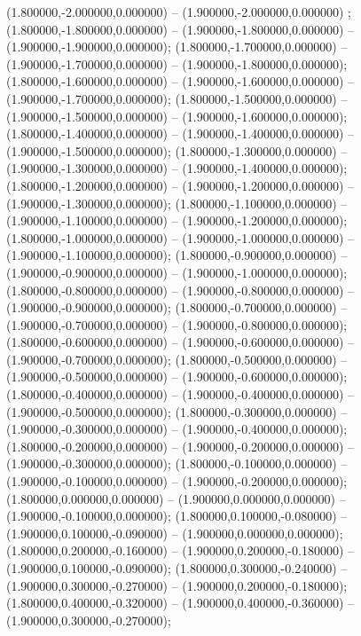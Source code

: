  (1.800000,-2.000000,0.000000) -- (1.900000,-2.000000,0.000000) ;
 (1.800000,-1.800000,0.000000) -- (1.900000,-1.800000,0.000000) -- (1.900000,-1.900000,0.000000);
 (1.800000,-1.700000,0.000000) -- (1.900000,-1.700000,0.000000) -- (1.900000,-1.800000,0.000000);
 (1.800000,-1.600000,0.000000) -- (1.900000,-1.600000,0.000000) -- (1.900000,-1.700000,0.000000);
 (1.800000,-1.500000,0.000000) -- (1.900000,-1.500000,0.000000) -- (1.900000,-1.600000,0.000000);
 (1.800000,-1.400000,0.000000) -- (1.900000,-1.400000,0.000000) -- (1.900000,-1.500000,0.000000);
 (1.800000,-1.300000,0.000000) -- (1.900000,-1.300000,0.000000) -- (1.900000,-1.400000,0.000000);
 (1.800000,-1.200000,0.000000) -- (1.900000,-1.200000,0.000000) -- (1.900000,-1.300000,0.000000);
 (1.800000,-1.100000,0.000000) -- (1.900000,-1.100000,0.000000) -- (1.900000,-1.200000,0.000000);
 (1.800000,-1.000000,0.000000) -- (1.900000,-1.000000,0.000000) -- (1.900000,-1.100000,0.000000);
 (1.800000,-0.900000,0.000000) -- (1.900000,-0.900000,0.000000) -- (1.900000,-1.000000,0.000000);
 (1.800000,-0.800000,0.000000) -- (1.900000,-0.800000,0.000000) -- (1.900000,-0.900000,0.000000);
 (1.800000,-0.700000,0.000000) -- (1.900000,-0.700000,0.000000) -- (1.900000,-0.800000,0.000000);
 (1.800000,-0.600000,0.000000) -- (1.900000,-0.600000,0.000000) -- (1.900000,-0.700000,0.000000);
 (1.800000,-0.500000,0.000000) -- (1.900000,-0.500000,0.000000) -- (1.900000,-0.600000,0.000000);
 (1.800000,-0.400000,0.000000) -- (1.900000,-0.400000,0.000000) -- (1.900000,-0.500000,0.000000);
 (1.800000,-0.300000,0.000000) -- (1.900000,-0.300000,0.000000) -- (1.900000,-0.400000,0.000000);
 (1.800000,-0.200000,0.000000) -- (1.900000,-0.200000,0.000000) -- (1.900000,-0.300000,0.000000);
 (1.800000,-0.100000,0.000000) -- (1.900000,-0.100000,0.000000) -- (1.900000,-0.200000,0.000000);
 (1.800000,0.000000,0.000000) -- (1.900000,0.000000,0.000000) -- (1.900000,-0.100000,0.000000);
 (1.800000,0.100000,-0.080000) -- (1.900000,0.100000,-0.090000) -- (1.900000,0.000000,0.000000);
 (1.800000,0.200000,-0.160000) -- (1.900000,0.200000,-0.180000) -- (1.900000,0.100000,-0.090000);
 (1.800000,0.300000,-0.240000) -- (1.900000,0.300000,-0.270000) -- (1.900000,0.200000,-0.180000);
 (1.800000,0.400000,-0.320000) -- (1.900000,0.400000,-0.360000) -- (1.900000,0.300000,-0.270000);
